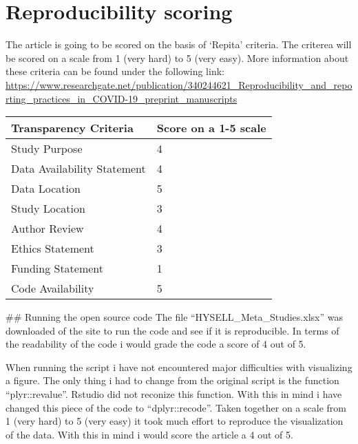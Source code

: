 \documentclass[
]{book}
\begin{document}
\hypertarget{reproducibility-scoring}{%
\section{Reproducibility scoring}\label{reproducibility-scoring}}

The article is going to be scored on the basis of `Repita' criteria. The criterea will be scored on a scale from 1 (very hard) to 5 (very easy). More information about these criteria can be found under the following link:
\url{https://www.researchgate.net/publication/340244621_Reproducibility_and_reporting_practices_in_COVID-19_preprint_manuscripts}

\begin{longtable}[]{@{}ll@{}}
\toprule()
Transparency Criteria & Score on a 1-5 scale \\
\midrule()
\endhead
Study Purpose & 4 \\
Data Availability Statement & 4 \\
Data Location & 5 \\
Study Location & 3 \\
Author Review & 4 \\
Ethics Statement & 3 \\
Funding Statement & 1 \\
Code Availability & 5 \\
\bottomrule()
\end{longtable}

\#\# Running the open source code
The file ``HYSELL\_Meta\_Studies.xlsx'' was downloaded of the site to run the code and see if it is reproducible. In terms of the readability of the code i would grade the code a score of 4 out of 5.

When running the script i have not encountered major difficulties with visualizing a figure. The only thing i had to change from the original script is the function ``plyr::revalue''. Rstudio did not reconize this function. With this in mind i have changed this piece of the code to ``dplyr::recode''.
Taken together on a scale from 1 (very hard) to 5 (very easy) it took much effort to reproduce the visualization of the data. With this in mind i would score the article a 4 out of 5.
\end{document}
